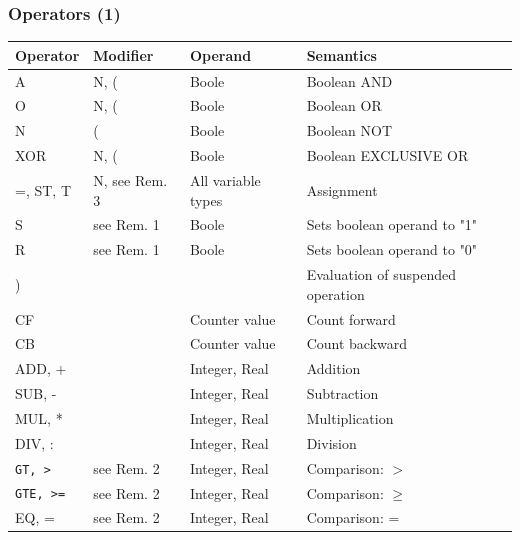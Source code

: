 \begin{frame}
	\frametitle{Operators (1)}
	\centering
	\footnotesize
	\begin{table}
		\setlength{\tabcolsep}{3pt} %
		\centering
		\begin{tabular}{@{}>{\raggedright\arraybackslash}p{2.5cm}
						>{\raggedright\arraybackslash}p{2cm}
						>{\raggedright\arraybackslash}p{2.5cm}
						>{\raggedright\arraybackslash}p{5cm}@{}}
			\toprule
			\textbf{Operator} & \textbf{Modifier} & \textbf{Operand} & \textbf{Semantics} \\
			\midrule
			A        & N, (          & Boole              & Boolean AND \\
			O        & N, (          & Boole              & Boolean OR \\
			N        & (             & Boole              & Boolean NOT \\
			XOR      & N, (          & Boole              & Boolean EXCLUSIVE OR \\
			=, ST, T & N, see Rem. 3 & All variable types & Assignment \\
			S        & see Rem. 1    & Boole              & Sets boolean operand to "1" \\
			R        & see Rem. 1    & Boole              & Sets boolean operand to "0" \\
			)        &               &                    & Evaluation of suspended operation \\
			CF       &               & Counter value      & Count forward \\
			CB       &               & Counter value      & Count backward \\
			ADD, +   &               & Integer, Real      & Addition \\
			SUB, -   &               & Integer, Real      & Subtraction \\
			MUL, *   &               & Integer, Real      & Multiplication \\
			DIV, :   &               & Integer, Real      & Division \\
			\texttt{GT, >} & see Rem. 2 & Integer, Real & Comparison: $>$ \\
			\texttt{GTE, >=} & see Rem. 2 & Integer, Real & Comparison: $\geq$ \\
			EQ, =    & see Rem. 2    & Integer, Real      & Comparison: = \\
			\bottomrule
		\end{tabular}
	\end{table}
\end{frame}

